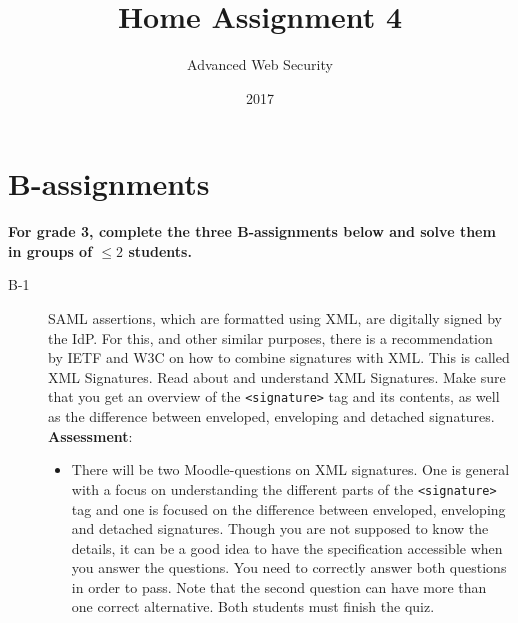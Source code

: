 \documentclass{article}
\begin{document}
	
	\title{Home Assignment 4}
	\author{Advanced Web Security}
	\date{2017}
	
	\maketitle
	
	\section*{B-assignments}
	\textbf{For grade 3, complete the three B-assignments below and solve them in groups of $\leq 2$ students.}
	
	\begin{description}
		
		\item[B-1]{SAML assertions, which are formatted using XML, are digitally signed by the IdP. For this, and other similar purposes, there is a recommendation by IETF and W3C on how to combine signatures with XML. This is called XML Signatures. Read about and understand XML Signatures. Make sure that you get an overview of the \texttt{<signature>} tag and its contents, as well as the difference between enveloped, enveloping and detached signatures.\\
			\textbf{Assessment}:
			\begin{itemize}
				\item There will be two Moodle-questions on XML signatures. One is general with a focus on understanding the different parts of the \texttt{<signature>} tag and one is focused on the difference between enveloped, enveloping and detached signatures. Though you are not supposed to know the details, it can be a good idea to have the specification accessible when you answer the questions. You need to correctly answer both questions in order to pass. Note that the second question can have more than one correct alternative. Both students must finish the quiz.
			\end{itemize}}
			

\end{description}
\end{document}
